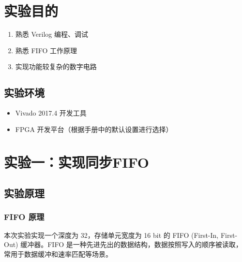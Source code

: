 \documentclass[zihao=5, UTF8]{article}
\theoremstyle{MyLineTheoremStyle} %
\theoremstyle{MyBlockTheoremStyle} %
\theoremstyle{MySubsubsectionStyle} %
\begin{document}
\section{实验目的}\thispagestyle{fancy}

\begin{enumerate}
    \item 熟悉 Verilog 编程、调试
    \item 熟悉 FIFO 工作原理
    \item 实现功能较复杂的数字电路
\end{enumerate}


\subsection{实验环境}
\begin{itemize}
    \item Vivado 2017.4 开发工具
    \item FPGA 开发平台（根据手册中的默认设置进行选择）
\end{itemize}

\section{实验一：实现同步FIFO}
\subsection{实验原理}
\subsubsection{FIFO 原理}
本次实验实现一个深度为 32，存储单元宽度为 16 bit 的 FIFO (First-In, First-Out) 缓冲器。FIFO 是一种先进先出的数据结构，数据按照写入的顺序被读取，常用于数据缓冲和速率匹配等场景。
\end{document}
